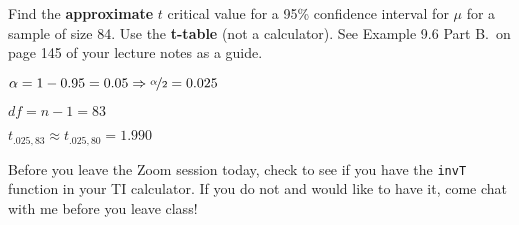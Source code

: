 \documentclass[noanswers]{exam}
\begin{document}
\begin{questions}
	\vspace{3mm}
	
	\question Find the \textbf{approximate} $t$ critical value for a 95\% confidence interval for $\mu$ for a sample of size 84. Use the \textbf{t-table} (not a calculator). See Example 9.6 Part B.\ on page 145 of your lecture notes as a guide.
	
	\begin{solution}[\stretch{1}]
	
	\begin{multicols}{2}


	$\alpha=1-0.95=0.05 \Rightarrow \nicefrac{\alpha}{2}=0.025$
	
	$df=n-1=83$
	
	$t_{.025,83}\approx t_{.025,80}=1.990$
	
	\end{multicols}

	\end{solution}	
	
\end{questions}

\noindent Before you leave the Zoom session today, check to see if you have the \verb|invT| function in your TI calculator. If you do not and would like to have it, come chat with me before you leave class!
\end{document}
